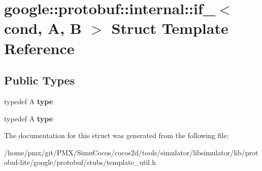 \hypertarget{structgoogle_1_1protobuf_1_1internal_1_1if__}{}\section{google\+:\+:protobuf\+:\+:internal\+:\+:if\+\_\+$<$ cond, A, B $>$ Struct Template Reference}
\label{structgoogle_1_1protobuf_1_1internal_1_1if__}
\subsection*{Public Types}
\begin{DoxyCompactItemize}
\item 
\mbox{\label{structgoogle_1_1protobuf_1_1internal_1_1if___a9dcb02e7f4d210c8b881f797c1b6d870}} 
typedef A {\bfseries type}
\item 
\mbox{\label{structgoogle_1_1protobuf_1_1internal_1_1if___a9dcb02e7f4d210c8b881f797c1b6d870}} 
typedef A {\bfseries type}
\end{DoxyCompactItemize}


The documentation for this struct was generated from the following file\+:\begin{DoxyCompactItemize}
\item 
/home/pmx/git/\+P\+M\+X/\+Simu\+Cocos/cocos2d/tools/simulator/libsimulator/lib/protobuf-\/lite/google/protobuf/stubs/template\+\_\+util.\+h\end{DoxyCompactItemize}
